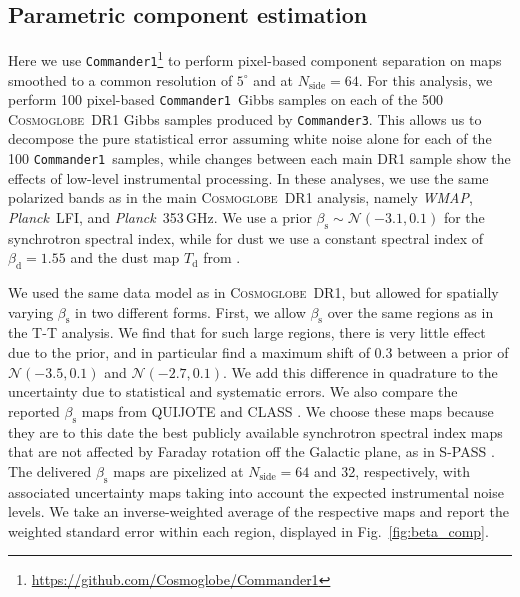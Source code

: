 \documentclass[twocolumn]{../../common/aa}
\def\WMAP{\emph{WMAP}}
\def\Planck{\emph{Planck}}
\def\commanderone{\texttt{Commander1}}
\def\commanderthree{\texttt{Commander3}}
\newcommand{\cosmoglobe}{\textsc{Cosmoglobe}}
\begin{document}


\subsection{Parametric component estimation}
\label{sec:comm1}

Here we use \commanderone\footnote{\url{https://github.com/Cosmoglobe/Commander1}} to perform pixel-based component separation on maps smoothed to a common resolution of $5^\circ$ and at $N_\mathrm{side}=64$. 
For this analysis, we perform 100 pixel-based \commanderone\ Gibbs samples on each of the 500 \cosmoglobe\ DR1 Gibbs samples produced by \commanderthree. This allows us to decompose the pure statistical error assuming white noise alone for each of the 100 \commanderone\ samples, while changes between each main DR1 sample show the effects of low-level instrumental processing. In these analyses, we use the same polarized bands as in the main \cosmoglobe\ DR1 analysis, namely \WMAP, \Planck\ LFI, and \Planck\ 353\,GHz. We use a prior $\beta_\mathrm s\sim\mathcal N(-3.1, 0.1)$ for the synchrotron spectral index, while for dust we use a constant spectral index of $\beta_\mathrm d=1.55$ and the dust map $T_\mathrm d$ from \citet{planck2014-a12}.

We used the same data model as in \cosmoglobe\ DR1, but allowed for spatially varying $\beta_\mathrm s$ in two different forms.
First, we allow $\beta_\mathrm s$ over the same regions as in the T-T analysis.
We find that for such large regions, there is very little effect due to the prior, and in particular find a maximum shift of 0.3 between a prior of $\mathcal N(-3.5,0.1)$ and $\mathcal N(-2.7, 0.1)$. We add this difference in quadrature to the uncertainty due to statistical and systematic errors. 
We also compare the reported $\beta_\mathrm s$ maps from QUIJOTE \citep{QUIJOTE_VIII} and CLASS \citep{eimer2023}. We choose these maps because they are to this date the best publicly available synchrotron spectral index maps that are not affected by Faraday rotation off the Galactic plane, as in S-PASS \citep{krachmalnicoff2018,fuskeland:2019}. The delivered $\beta_\mathrm s$ maps are pixelized at $N_\mathrm{side}=64$ and 32, respectively, with associated uncertainty maps taking into account the expected instrumental noise levels. We take an inverse-weighted average of the respective maps and report the weighted standard error within each region, displayed in Fig.~\ref{fig:beta_comp}. 
\end{document}
